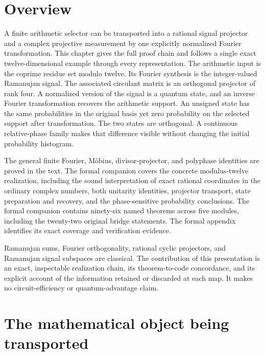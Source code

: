 \hypertarget{q:abstract}{%
\section*{Overview}\label{q:abstract}}

A finite arithmetic selector can be transported into a rational signal
projector and a complex projective measurement by one explicitly
normalized Fourier transformation. This chapter gives the full proof chain
and follows a single exact twelve-dimensional example through every
representation. The arithmetic input is the coprime residue set modulo
twelve. Its Fourier synthesis is the integer-valued Ramanujan signal.
The associated circulant matrix is an orthogonal projector of rank four.
A normalized version of the signal is a quantum state, and an inverse
Fourier transformation recovers the arithmetic support. An unsigned
state has the same probabilities in the original basis yet zero
probability on the selected support after transformation. The two states
are orthogonal. A continuous relative-phase family makes that difference
visible without changing the initial probability histogram.

The general finite Fourier, Möbius, divisor-projector, and polyphase
identities are proved in the text. The formal companion covers the
concrete modulus-twelve realization, including the sound interpretation
of exact rational coordinates in the ordinary complex numbers, both
unitarity identities, projector transport, state preparation and
recovery, and the phase-sensitive probability conclusions. The formal companion contains ninety-six named theorems across five modules, including the twenty-two original bridge statements. The formal appendix identifies its exact coverage and verification evidence.

Ramanujan sums, Fourier orthogonality, rational cyclic projectors, and
Ramanujan signal subspaces are classical. The contribution of this
presentation is an exact, inspectable realization chain, its
theorem-to-code concordance, and its explicit account of the information
retained or discarded at each map. It makes no circuit-efficiency or
quantum-advantage claim.

\hypertarget{q:the-mathematical-object-being-transported}{%
\section{The mathematical object being
transported}\label{q:the-mathematical-object-being-transported}}

